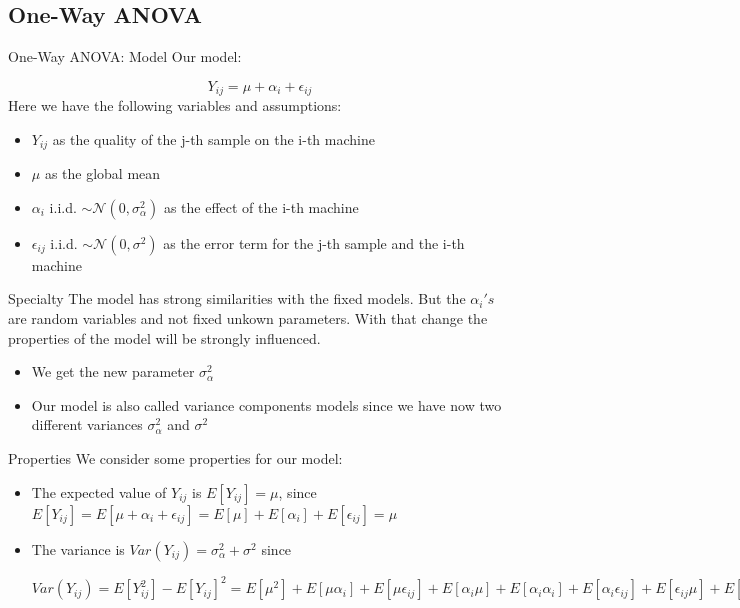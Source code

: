 \documentclass[unknownkeysallowed]{beamer}
\begin{document}
	\subsection{One-Way ANOVA}
	\begin{frame}{One-Way ANOVA: Model}
		Our model:
		
		$$
		Y_{ij} = \mu + \alpha_i + \epsilon_{ij}
		$$
		Here we have the following variables and assumptions:
		\begin{itemize}
			\item $Y_{ij}$ as the quality of the j-th sample on the i-th machine 
			\item $\mu$ as the global mean
			\item $\alpha_i$ i.i.d.  
			$\sim \mathcal{N}(0,\sigma^2_{\alpha})$ as the effect of the i-th machine
			\item $\epsilon_{ij}$ i.i.d. $\sim \mathcal{N}(0,\sigma^2)$ as the error term for the j-th sample and the i-th machine
		\end{itemize}
	\end{frame}
	
	\begin{frame}{Specialty}
		The model has strong similarities with the fixed models. But the $\alpha_i's$ are random variables and not fixed unkown parameters.
		With that change the properties of the model will be strongly influenced.
		\begin{itemize}
			\item We get the new parameter $\sigma^2_{\alpha}$
			\item Our model is also called variance components models since we have now two different variances $\sigma^2_{\alpha}$ and $\sigma^2$
		\end{itemize}
	\end{frame}
	
	\begin{frame}{Properties}
		We consider some properties for our model:
		\begin{itemize}
			\item The expected value of $Y_{ij}$ is $E[Y_{ij}]=\mu$, since $E[Y_{ij}] = E[\mu + \alpha_i + \epsilon_{ij}] = E[\mu] + E[\alpha_i] + E[\epsilon_{ij}] = \mu$
			\item The variance is $Var(Y_{ij}) = \sigma^2_{\alpha} +\sigma^2$ since
			
			$Var(Y_{ij}) = E[Y_{ij}^2] - E[Y_{ij}]^2
			= E[\mu^2] + E[\mu \alpha_i] + E[\mu \epsilon_{ij}] + E[\alpha_i \mu] + E[\alpha_i \alpha_i] + E[\alpha_i \epsilon_{ij}] + E[\epsilon_{ij} \mu] + E[\epsilon_{ij}\alpha_i] + E[\epsilon_{ij}\epsilon_{ij}] - \mu^2
			= \mu^2 + \mu \underbrace{E[\alpha_i]}_\text{= 0} + \mu \underbrace{E[\epsilon_{ij}]}_\text{= 0} + \underbrace{E[\alpha_i]}_\text{=0}\mu + E[\alpha_i^2] + \underbrace{E[\alpha_i]}_\text{= 0}\underbrace{E[\epsilon_{ij}]}_\text{= 0} + \underbrace{E[\epsilon_{ij}]}_\text{=0}\mu + \underbrace{E[\epsilon_{ij}]}_\text{=0} \underbrace{E[\alpha_i]}_\text{=0} + E[\epsilon_{ij}^2] - \mu^2 
			= E[\alpha_i^2] + E[\epsilon_{ij}^2]
			= \sigma^2_{\alpha} + \sigma^2$
		\end{itemize}
	\end{frame}
	
\end{document}
